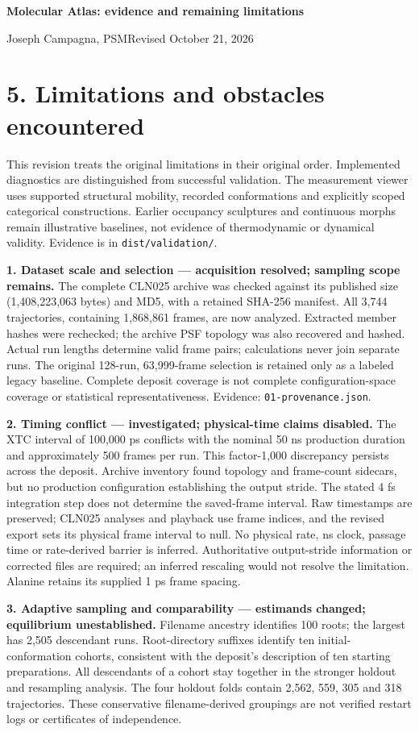 \documentclass[11pt]{article}
\begin{document}
  {\large\bfseries Molecular Atlas: evidence and remaining limitations}\par
  Joseph Campagna, PSM\hfill Revised October 21, 2026
\fi

\section*{5. Limitations and obstacles encountered}
This revision treats the original limitations in their original order.
Implemented diagnostics are distinguished from successful validation.
The measurement viewer uses supported structural mobility, recorded conformations
and explicitly scoped categorical constructions. Earlier occupancy sculptures
and continuous morphs remain illustrative baselines, not evidence of
thermodynamic or dynamical validity. Evidence is in \texttt{dist/validation/}.

\textbf{1. Dataset scale and selection --- acquisition resolved; sampling scope remains.}
The complete CLN025 archive was checked against its published size
(1,408,223,063 bytes) and MD5, with a retained SHA-256 manifest.
All 3,744 trajectories, containing 1,868,861 frames, are now analyzed.
Extracted member hashes were rechecked; the archive PSF topology was also
recovered and hashed. Actual run lengths determine valid frame pairs;
calculations never join separate runs. The original 128-run, 63,999-frame
selection is retained only as a labeled legacy baseline.
Complete deposit coverage is not complete configuration-space coverage or
statistical representativeness. Evidence: \texttt{01-provenance.json}.

\textbf{2. Timing conflict --- investigated; physical-time claims disabled.}
The XTC interval of 100,000 ps conflicts with the nominal 50 ns production
duration and approximately 500 frames per run. This factor-1,000 discrepancy
persists across the deposit. Archive inventory found topology and frame-count
sidecars, but no production configuration establishing the output stride.
The stated 4 fs integration step does not determine the saved-frame interval.
Raw timestamps are preserved; CLN025 analyses and playback use frame indices,
and the revised export sets its physical frame interval to null.
No physical rate, ns clock, passage time or rate-derived barrier is inferred.
Authoritative output-stride information or corrected files are required;
an inferred rescaling would not resolve the limitation. Alanine retains
its supplied 1 ps frame spacing.

\textbf{3. Adaptive sampling and comparability --- estimands changed; equilibrium unestablished.}
Filename ancestry identifies 100 roots; the largest has 2,505 descendant runs.
Root-directory suffixes identify ten initial-conformation cohorts, consistent
with the deposit's description of ten starting preparations. All descendants
of a cohort stay together in the stronger holdout and resampling analysis.
The four holdout folds contain 2,562, 559, 305 and 318 trajectories.
These conservative filename-derived groupings are not verified restart logs
or certificates of independence.
\end{document}
